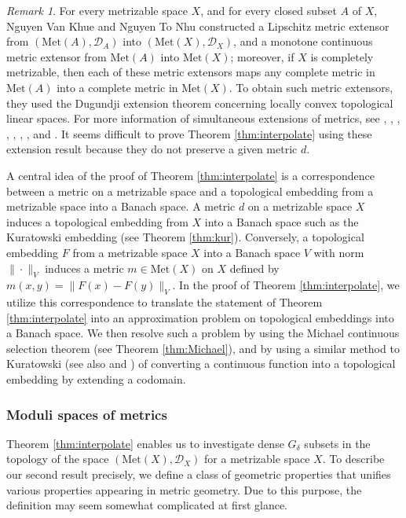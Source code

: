\documentclass[a4paper, 12pt]{amsart}
\theoremstyle{plain}
\theoremstyle{definition}
\theoremstyle{remark}
\newtheorem{rmk}{Remark}[section]
\newcommand{\met}[1]{\mathrm{Met}(#1)}
\newcommand{\metdis}{\mathcal{D}}
\begin{document}
\begin{rmk}
For every  metrizable space 
$X$, 
and for every closed subset 
$A$ 
of 
$X$, 
Nguyen Van Khue and Nguyen To Nhu 
\cite{NN1981} 
constructed  
a Lipschitz metric extensor from 
$(\met{A}, \metdis_{A})$ 
into 
$(\met{X}, \metdis_{X})$, 
and a monotone continuous 
metric  extensor from 
$\met{A}$ 
into 
$\met{X}$;
moreover, 
if 
$X$ 
is completely metrizable, 
then each of these metric extensors maps any complete metric in 
$\met{A}$ 
into  a complete metric in 
$\met{X}$.  
To obtain 
such metric extensors, they used the Dugundji extension theorem concerning locally convex topological linear spaces. 
For more information of simultaneous extensions of 
metrics, see  
\cite{MR1751152}, 
\cite{MR3712976}, 
 \cite{MR1455501}, 
\cite{MR2054807}, 
\cite{MR2761694},
\cite{MR2857823}, 
\cite{MR2957499}, 
and 
\cite{MR2857999}. 
It seems difficult to prove 
Theorem 
\ref{thm:interpolate}
using these extension result because 
they do not preserve a given metric 
$d$. 
\end{rmk}

A central idea of the proof of Theorem \ref{thm:interpolate}
is a correspondence between a metric on a metrizable space and a topological embedding from a metrizable space into 
a Banach space. 
A metric 
$d$ 
 on a metrizable space 
 $X$ 
 induces a topological embedding 
from 
$X$ 
into a Banach space such as
 the Kuratowski embedding  
 (see Theorem \ref{thm:kur}). 
Conversely, a topological embedding 
$F$ 
from a metrizable space 
$X$ 
into a Banach space 
$V$ 
with norm 
$\|\cdot\|_V$ 
induces a metric 
$m\in \met{X}$ 
on 
$X$ 
defined by 
$m(x, y)=\|F(x)-F(y)\|_{V}$. 
In the proof of Theorem 
\ref{thm:interpolate}, 
we utilize this correspondence to translate
 the statement of Theorem 
 \ref{thm:interpolate} into an approximation  problem on 
 topological embeddings into a Banach space. 
We then  resolve such a problem by using  the Michael continuous selection theorem 
(see Theorem \ref{thm:Michael}), 
and by using a similar method to 
Kuratowski 
\cite{Ku1938} 
(see also 
\cite{Hausdorff1938}
 and
  \cite{MR0049543})
of converting a continuous function
 into a topological embedding by extending a codomain. 





\subsubsection{Moduli spaces of metrics}
Theorem \ref{thm:interpolate} enables 
us to investigate  dense 
$G_{\delta}$ 
subsets in the topology of the space 
$(\met{X}, \metdis_{X})$ 
for a metrizable space 
$X$. 
To  describe our second result precisely, 
we define  a class of geometric properties that unifies  various properties appearing  
 in metric geometry. Due to this purpose, 
 the definition may seem somewhat complicated at first glance.
\end{document}
